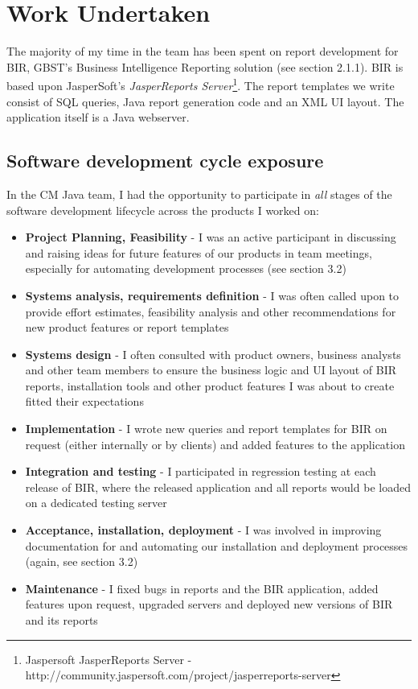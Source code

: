 \chapter{Work Undertaken}
The majority of my time in the team has been spent on report development for BIR, GBST's Business Intelligence Reporting solution (see section 2.1.1). BIR is based upon JasperSoft's \textit{JasperReports Server}\footnote{Jaspersoft JasperReports Server - http://community.jaspersoft.com/project/jasperreports-server}. The report templates we write consist of SQL queries, Java report generation code and an XML UI layout. The application itself is a Java webserver.

\section{Software development cycle exposure}

In the CM Java team, I had the opportunity to participate in \textit{all} stages of the software development lifecycle across the products I worked on:
\begin{itemize}
\item \textbf{Project Planning, Feasibility} - I was an active participant in discussing and raising ideas for future features of our products in team meetings, especially for automating development processes (see section 3.2)
\item \textbf{Systems analysis, requirements definition} - I was often called upon to provide effort estimates, feasibility analysis and other recommendations for new product features or report templates
\item \textbf{Systems design} - I often consulted with product owners, business analysts and other team members to ensure the business logic and UI layout of BIR reports, installation tools and other product features I was about to create fitted their expectations
\item \textbf{Implementation} - I wrote new queries and report templates for BIR on request (either internally or by clients) and added features to the application
\item \textbf{Integration and testing} - I participated in regression testing at each release of BIR, where the released application and all reports would be loaded on a dedicated testing server
\item \textbf{Acceptance, installation, deployment} - I was involved in improving documentation for and automating our installation and deployment processes (again, see section 3.2)
\item \textbf{Maintenance} - I fixed bugs in reports and the BIR application, added features upon request, upgraded servers and deployed new versions of BIR and its reports
\end{itemize}
\vspace{5mm}

